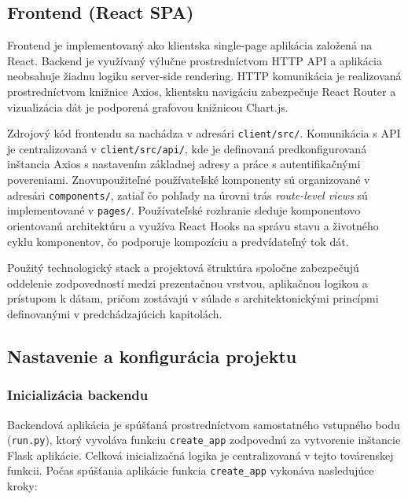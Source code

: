 
\subsection{Frontend (React SPA)} 

Frontend je implementovaný ako klientska single-page aplikácia založená na React. Backend je využívaný výlučne prostredníctvom HTTP API a aplikácia neobsahuje žiadnu logiku server-side rendering. HTTP komunikácia je realizovaná prostredníctvom knižnice Axios, klientsku navigáciu zabezpečuje React Router a vizualizácia dát je podporená grafovou knižnicou Chart.js.

Zdrojový kód frontendu sa nachádza v adresári \texttt{client/src/}. Komunikácia s API je centralizovaná v \texttt{client/src/api/}, kde je definovaná predkonfigurovaná inštancia Axios s nastavením základnej adresy a práce s autentifikačnými povereniami. Znovupoužiteľné používateľské komponenty sú organizované v adresári \texttt{components/}, zatiaľ čo pohľady na úrovni trás \textit{route-level views} sú implementované v \texttt{pages/}. Používateľské rozhranie sleduje komponentovo orientovanú architektúru a využíva React Hooks na správu stavu a životného cyklu komponentov, čo podporuje kompozíciu a predvídateľný tok dát.

Použitý technologický stack a projektová štruktúra spoločne zabezpečujú  oddelenie zodpovedností medzi prezentačnou vrstvou, aplikačnou logikou a prístupom k dátam, pričom zostávajú v súlade s architektonickými princípmi definovanými v predchádzajúcich kapitolách.


\subsection{Nastavenie a konfigurácia projektu}

\subsubsection{Inicializácia backendu}

Backendová aplikácia je spúšťaná prostredníctvom samostatného vstupného bodu (\texttt{run.py}), ktorý vyvoláva funkciu \texttt{create\_app} zodpovednú za vytvorenie inštancie Flask aplikácie. Celková inicializačná logika je centralizovaná v tejto továrenskej funkcii. Počas spúšťania aplikácie funkcia \texttt{create\_app} vykonáva nasledujúce kroky: 

